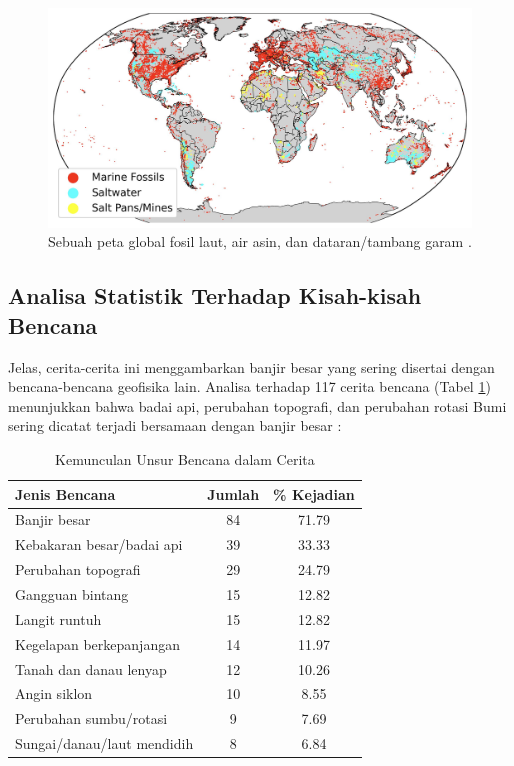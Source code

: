\documentclass[10pt,twocolumn,letterpaper]{article}
\begin{document}
\begin{figure}[b]
\begin{center}
\includegraphics[width=1\textwidth]{marine.jpg}
\end{center}
   \caption{Sebuah peta global fosil laut, air asin, dan dataran/tambang garam \cite{15,16,86,87}.}
   \label{fig:2}
\end{figure}

\subsection{Analisa Statistik Terhadap Kisah-kisah Bencana}

Jelas, cerita-cerita ini menggambarkan banjir besar yang sering disertai dengan bencana-bencana geofisika lain. Analisa terhadap 117 cerita bencana (Tabel \ref{tab: 1}) menunjukkan bahwa badai api, perubahan topografi, dan perubahan rotasi Bumi sering dicatat terjadi bersamaan dengan banjir besar \cite{14}:

\begin{table}[ht]
\begin{center}
\renewcommand{\arraystretch}{1.2}  %
\begin{tabular}{|l|c|c|}
\hline
\textbf{Jenis Bencana} & \textbf{Jumlah} & \textbf{\% Kejadian} \\
\hline\hline
Banjir besar            & 84 & 71.79 \\
Kebakaran besar/badai api & 39 & 33.33 \\
Perubahan topografi   & 29 & 24.79 \\
Gangguan bintang     & 15 & 12.82 \\
Langit runtuh           & 15 & 12.82 \\
Kegelapan berkepanjangan      & 14 & 11.97 \\
Tanah dan danau lenyap    & 12 & 10.26 \\
Angin siklon            & 10 & 8.55  \\
Perubahan sumbu/rotasi & 9 & 7.69  \\
Sungai/danau/laut mendidih & 8 & 6.84 \\
\hline
\end{tabular}
\end{center}
\caption{Kemunculan Unsur Bencana dalam Cerita}
\label{tab: 1}
\end{table}
\end{document}
